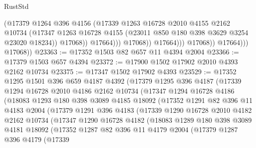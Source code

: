 \begin{lexlean}{RustStd}
\begin{coremodule}
                                  (@17379
                                    @1264
                                    @396
                                    @4156
                                    (@17339
                                      @1263
                                      @16728
                                      @2010
                                      @4155
                                      @2162
                                      @10734
                                      (@17347
                                        @1263
                                        @16728
                                        @4155
                                        (@23011 @850 @180 @398 @3629 @3254 @23020 @18234))
                                      @17068))
                                  @17664)))
                            @17068))
                        @17664)))
                  @17068))
              @17664)))
        @17068))
@23363 := @17352 @1503 @82 @657 @11 @4394 @2004
@23366 := @17379 @1503 @657 @4394
@23372 := @17900 @1502 @17902 @2010 @4393 @2162 @10734
@23375 := @17347 @1502 @17902 @4393
@23529 := @17352
    @1295
    @1501
    @396
    @659
    @4187
    @4392
    (@17379
      @1295
      @396
      @4187
      (@17339
        @1294
        @16728
        @2010
        @4186
        @2162
        @10734
        (@17347
          @1294
          @16728
          @4186
          (@18083
            @1293
            @180
            @398
            @3089
            @4185
            @18092
            (@17352
              @1291
              @82
              @396
              @11
              @4183
              @2004
              (@17379
                @1291
                @396
                @4183
                (@17339
                  @1290
                  @16728
                  @2010
                  @4182
                  @2162
                  @10734
                  (@17347
                    @1290
                    @16728
                    @4182
                    (@18083
                      @1289
                      @180
                      @398
                      @3089
                      @4181
                      @18092
                      (@17352
                        @1287
                        @82
                        @396
                        @11
                        @4179
                        @2004
                        (@17379
                          @1287
                          @396
                          @4179
                          (@17339

\end{coremodule}
\end{lexlean}
